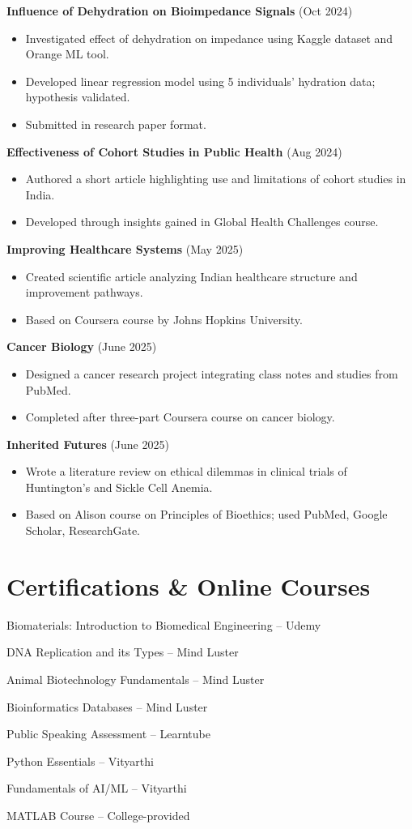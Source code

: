 \documentclass[a4paper,10pt]{article}
\newcommand{\resumeItem}[1]{\item\small{#1}}
\begin{document}
\resumeItem{\textbf{Influence of Dehydration on Bioimpedance Signals} (Oct 2024)
\begin{itemize}
  \item Investigated effect of dehydration on impedance using Kaggle dataset and Orange ML tool.
  \item Developed linear regression model using 5 individuals’ hydration data; hypothesis validated.
  \item Submitted in research paper format.
\end{itemize}}

\resumeItem{\textbf{Effectiveness of Cohort Studies in Public Health} (Aug 2024)
\begin{itemize}
  \item Authored a short article highlighting use and limitations of cohort studies in India.
  \item Developed through insights gained in Global Health Challenges course.
\end{itemize}}

\resumeItem{\textbf{Improving Healthcare Systems} (May 2025)
\begin{itemize}
  \item Created scientific article analyzing Indian healthcare structure and improvement pathways.
  \item Based on Coursera course by Johns Hopkins University.
\end{itemize}}

\resumeItem{\textbf{Cancer Biology} (June 2025)
\begin{itemize}
  \item Designed a cancer research project integrating class notes and studies from PubMed.
  \item Completed after three-part Coursera course on cancer biology.
\end{itemize}}

\resumeItem{\textbf{Inherited Futures} (June 2025)
\begin{itemize}
  \item Wrote a literature review on ethical dilemmas in clinical trials of Huntington’s and Sickle Cell Anemia.
  \item Based on Alison course on Principles of Bioethics; used PubMed, Google Scholar, ResearchGate.
\end{itemize}}

\section*{Certifications \& Online Courses}
\resumeItem{Biomaterials: Introduction to Biomedical Engineering – Udemy}
\resumeItem{DNA Replication and its Types – Mind Luster}
\resumeItem{Animal Biotechnology Fundamentals – Mind Luster}
\resumeItem{Bioinformatics Databases – Mind Luster}
\resumeItem{Public Speaking Assessment – Learntube}
\resumeItem{Python Essentials – Vityarthi}
\resumeItem{Fundamentals of AI/ML – Vityarthi}
\resumeItem{MATLAB Course – College-provided}
\end{document}
